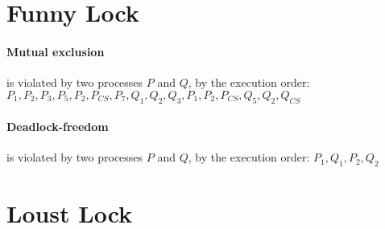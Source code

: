 \documentclass[12pt]{article}
\begin{document}
\section{Funny Lock}
\paragraph{Mutual exclusion}is violated by two processes $P$ and $Q$, by the execution order: $P_1, P_2, P_3, P_5, P_2, P_{CS}, P_7, Q_1, Q_2, Q_3, P_1, P_2, P_{CS}, Q_5, Q_2, Q_{CS}$
\paragraph{Deadlock-freedom}is violated by two processes $P$ and $Q$, by the execution order: $P_1, Q_1, P_2, Q_2$

\section{Loust Lock}
\end{document}
